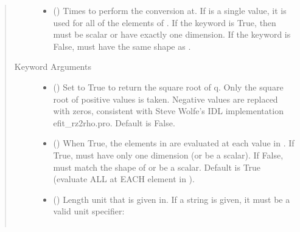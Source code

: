 \documentclass[letterpaper,10pt,english]{sphinxmanual}
\begin{document}
\begin{fulllineitems}
\begin{fulllineitems}
\begin{quote}
\begin{description}
\begin{itemize}
\item {} 
 () \textendash{} Times to perform the conversion at.
If  is a single value, it is used for all of the elements of
. If the  keyword is True, then  must be scalar
or have exactly one dimension. If the  keyword is False,
 must have the same shape as .

\end{itemize}

\item[{Keyword Arguments}] \leavevmode\begin{itemize}
\item {} 
 () \textendash{} Set to True to return the square root of q.
Only the square root of positive values is taken. Negative
values are replaced with zeros, consistent with Steve Wolfe’s
IDL implementation efit\_rz2rho.pro. Default is False.

\item {} 
 () \textendash{} When True, the elements in  are evaluated
at each value in . If True,  must have only one dimension
(or be a scalar). If False,  must match the shape of 
or be a scalar. Default is True (evaluate ALL  at EACH
element in ).

\item {} 
 () \textendash{} 
Length unit that  is given in.
If a string is given, it must be a valid unit specifier:
\begin{quote}


\begin{savenotes}\sphinxattablestart
\centering
\begin{tabulary}{\linewidth}[t]{|T|T|}
\hline


\end{tabulary}
\end{savenotes}
\end{quote}
\end{itemize}
\end{description}
\end{quote}
\end{fulllineitems}
\end{fulllineitems}
\end{document}
